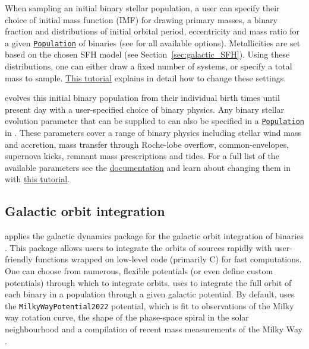 \documentclass[twocolumn, twocolappendix, oneside]{aastex631}
\newcommand{\codeLink}[2]{{\href{https://cogsworth.readthedocs.io/en/latest/api/cogsworth.#2.#1.html}{\color{codecolour} \texttt{#1}}}}
\newcommand{\tutorialLink}[2]{\href{#1}{{\color{codecolour}#2}}}
\begin{document}
When sampling an initial binary stellar population, a user can specify their choice of initial mass function (IMF) for drawing primary masses, a binary fraction and distributions of initial orbital period, eccentricity and mass ratio for a given \codeLink{Population}{pop} of binaries (see \citealp[Section 2.1.1 of][]{COSMIC} for all available options). Metallicities are set based on the chosen SFH model (see Section~\ref{sec:galactic_SFH}). Using these distributions, one can either draw a fixed number of systems, or specify a total mass to sample. \tutorialLink{https://cogsworth.readthedocs.io/en/latest/tutorials/pop_settings/sampling.html}{This tutorial} explains in detail how to change these settings.

\cogsworth evolves this initial binary population from their individual birth times until present day with a user-specified choice of binary physics. Any binary stellar evolution parameter that can be supplied to \cosmic can also be specified in a \codeLink{Population}{pop} in \cogsworth. These parameters cover a range of binary physics including stellar wind mass and accretion, mass transfer through Roche-lobe overflow, common-envelopes, supernova kicks, remnant mass prescriptions and tides. For a full list of the available parameters see the \href{https://cosmic-popsynth.github.io}{\cosmic documentation} and learn about changing them in \cogsworth with \tutorialLink{https://cogsworth.readthedocs.io/en/latest/tutorials/pop_settings/pop_synth.html}{this tutorial}.

\subsection{Galactic orbit integration}\label{sec:orbit_integration}

\cogsworth applies the galactic dynamics package \gala{} for the galactic orbit integration of binaries \citep{Gala}. This package allows users to integrate the orbits of sources rapidly with user-friendly functions wrapped on low-level code (primarily C) for fast computations. One can choose from numerous, flexible potentials (or even define custom potentials) through which to integrate orbits. \cogsworth uses \gala to integrate the full orbit of each binary in a population through a given galactic potential. By default, \cogsworth uses the \texttt{MilkyWayPotential2022} potential, which is fit to observations of the Milky way rotation curve, the shape of the phase-space spiral in the solar neighbourhood and a compilation of recent mass measurements of the Milky Way \citep{Eilers+2019:2019ApJ...871..120E, Darragh-Ford+2023:2023ApJ...955...74D}.
\end{document}
